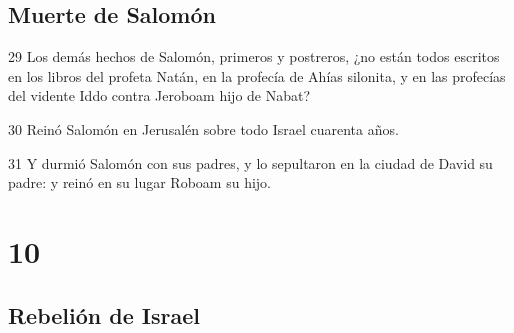 \section*{Muerte de Salomón}

\par 29 Los demás hechos de Salomón, primeros y postreros, ¿no están todos escritos en los libros del profeta Natán, en la profecía de Ahías silonita, y en las profecías del vidente Iddo contra Jeroboam hijo de Nabat?
\par 30 Reinó Salomón en Jerusalén  sobre todo Israel cuarenta años.
\par 31 Y durmió Salomón con sus padres, y lo sepultaron en la ciudad de David su padre: y reinó en su lugar Roboam su hijo.

\chapter{10}

\section*{Rebelión de Israel}

